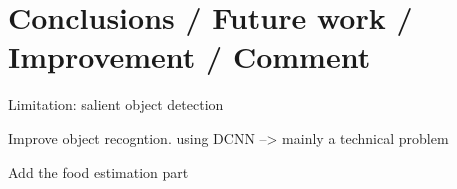 \chapter{Conclusions / Future work / Improvement / Comment}

Limitation: salient object detection

Improve object recogntion. using DCNN --> mainly a technical problem

Add the food estimation part
